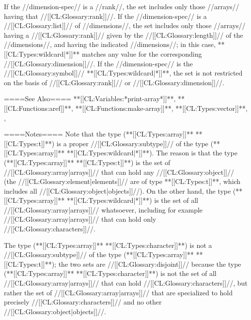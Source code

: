 If the //dimension-spec// is a //rank//, the set includes only those //arrays// having that //[[CL:Glossary:rank]]//. If the //dimension-spec// is a //[[CL:Glossary:list]]// of //dimensions//, the set includes only those //arrays// having a //[[CL:Glossary:rank]]// given by the //[[CL:Glossary:length]]// of the //dimensions//, and having the indicated //dimensions//; in this case, **[[CL:Types:wildcard|*]]** matches any value for the corresponding //[[CL:Glossary:dimension]]//. If the //dimension-spec// is the //[[CL:Glossary:symbol]]// **[[CL:Types:wildcard|*]]**, the set is not restricted on the basis of //[[CL:Glossary:rank]]// or //[[CL:Glossary:dimension]]//.

====See Also====
**[[CL:Variables:*print-array*]]**, **[[CL:Functions:aref]]**, **[[CL:Functions:make-array]]**, **[[CL:Types:vector]]**, {\secref\SharpsignA}, {\secref\PrintingOtherArrays}

====Notes====
Note that the type (**[[CL:Types:array]]** **[[CL:Types:t]]**) is a proper //[[CL:Glossary:subtype]]// of the type (**[[CL:Types:array]]** **[[CL:Types:wildcard|*]]**). The reason is that the type (**[[CL:Types:array]]** **[[CL:Types:t]]**) is the set of //[[CL:Glossary:array|arrays]]// that can hold any //[[CL:Glossary:object]]// (the //[[CL:Glossary:element|elements]]// are of type **[[CL:Types:t]]**, which includes all //[[CL:Glossary:object|objects]]//). On the other hand, the type (**[[CL:Types:array]]** **[[CL:Types:wildcard|*]]**) is the set of all //[[CL:Glossary:array|arrays]]// whatsoever, including for example //[[CL:Glossary:array|arrays]]// that can hold only //[[CL:Glossary:characters]]//.

The type (**[[CL:Types:array]]** **[[CL:Types:character]]**) is not a //[[CL:Glossary:subtype]]// of the type (**[[CL:Types:array]]** **[[CL:Types:t]]**); the two sets are //[[CL:Glossary:disjoint]]// because the type (**[[CL:Types:array]]** **[[CL:Types:character]]**) is not the set of all //[[CL:Glossary:array|arrays]]// that can hold //[[CL:Glossary:characters]]//, but rather the set of //[[CL:Glossary:array|arrays]]// that are specialized to hold precisely //[[CL:Glossary:characters]]// and no other //[[CL:Glossary:object|objects]]//.

